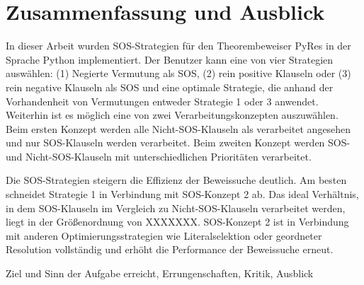 
\chapter{Zusammenfassung und Ausblick}

In dieser Arbeit wurden SOS-Strategien für den Theorembeweiser PyRes in der Sprache Python implementiert. Der Benutzer kann eine von vier Strategien auswählen: (1) Negierte Vermutung als SOS, (2) rein positive Klauseln oder (3) rein negative Klauseln als SOS und eine optimale Strategie, die anhand der Vorhandenheit von Vermutungen entweder Strategie 1 oder 3 anwendet. Weiterhin ist es möglich eine von zwei Verarbeitungskonzepten auszuwählen. Beim ersten Konzept werden alle Nicht-SOS-Klauseln als verarbeitet angesehen und nur SOS-Klauseln werden verarbeitet. Beim zweiten Konzept werden SOS- und Nicht-SOS-Klauseln mit unterschiedlichen Prioritäten verarbeitet.

Die SOS-Strategien steigern die Effizienz der Beweissuche deutlich. Am besten schneidet Strategie 1 in Verbindung mit SOS-Konzept 2 ab. Das ideal Verhältnis, in dem SOS-Klauseln im Vergleich zu Nicht-SOS-Klauseln verarbeitet werden, liegt in der Größenordnung von XXXXXXX. SOS-Konzept 2 ist in Verbindung mit anderen Optimierungsstrategien wie Literalselektion oder geordneter Resolution vollständig und erhöht die Performance der Beweissuche erneut. 



Ziel und Sinn der Aufgabe erreicht,
Errungenschaften, Kritik,
Ausblick